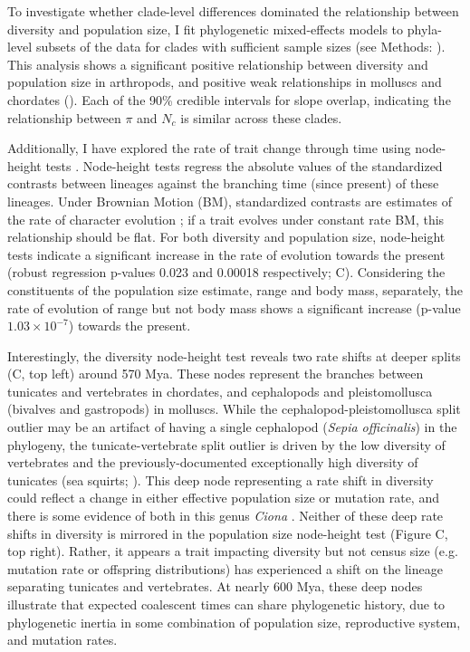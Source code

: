 \documentclass[9pt,lineno]{elife}
\begin{document}
To investigate whether clade-level differences dominated the relationship
between diversity and population size, I fit phylogenetic mixed-effects models
to phyla-level subsets of the data for clades with sufficient sample sizes (see
Methods: ). This analysis shows a significant positive
relationship between diversity and population size in arthropods, and positive
weak relationships in molluscs and chordates
(). Each of the 90\% credible intervals
for slope overlap, indicating the relationship between $\pi$ and $N_c$ is
similar across these clades.

Additionally, I have explored the rate of trait change through time using
node-height tests \citep{Freckleton2006-ww}. Node-height tests regress the
absolute values of the standardized contrasts between lineages against the
branching time (since present) of these lineages. Under Brownian Motion (BM),
standardized contrasts are estimates of the rate of character evolution
\citep{Felsenstein1985-an}; if a trait evolves under constant rate BM, this
relationship should be flat. For both diversity and population size,
node-height tests indicate a significant increase in the rate of evolution
towards the present (robust regression p-values 0.023 and 0.00018 respectively;
C). Considering the constituents of the population
size estimate, range and body mass, separately, the rate of evolution of range
but not body mass shows a significant increase (p-value $1.03 \times 10^{-7}$)
towards the present. 

Interestingly, the diversity node-height test reveals two rate shifts at deeper
splits (C, top left) around 570 Mya. These nodes
represent the branches between tunicates and vertebrates in chordates, and
cephalopods and pleistomollusca (bivalves and gastropods) in molluscs.  While
the cephalopod-pleistomollusca split outlier may be an artifact of having a
single cephalopod (\emph{Sepia officinalis}) in the phylogeny, the
tunicate-vertebrate split outlier is driven by the low diversity of vertebrates
and the previously-documented exceptionally high diversity of tunicates (sea
squirts; \cite{Nydam2010-kg,Small2007-mt}). This deep node representing a rate
shift in diversity could reflect a change in either effective population size
or mutation rate, and there is some evidence of both in this genus \emph{Ciona}
\citep{Small2007-mt,Tsagkogeorga2012-lv}. Neither of these deep rate shifts
in diversity is mirrored in the population size node-height test (Figure
C, top right). Rather, it appears a trait impacting diversity
but not census size (e.g. mutation rate or offspring distributions) has
experienced a shift on the lineage separating tunicates and vertebrates. At
nearly 600 Mya, these deep nodes illustrate that expected coalescent times can
share phylogenetic history, due to phylogenetic inertia in some combination of
population size, reproductive system, and mutation rates.
\end{document}
